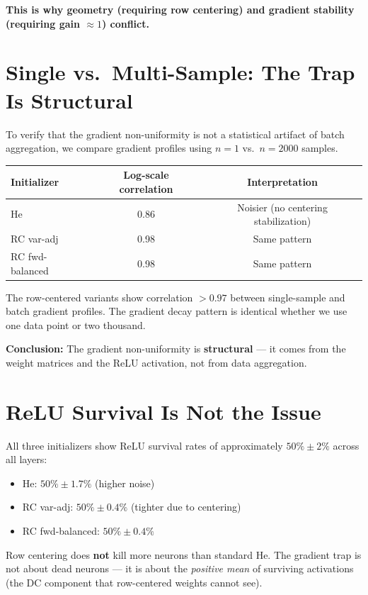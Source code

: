 \textbf{This is why geometry (requiring row centering) and gradient
stability (requiring gain $\approx 1$) conflict.}

\section{Single vs.\ Multi-Sample: The Trap Is Structural}
\label{sec:single_multi}

To verify that the gradient non-uniformity is not a statistical
artifact of batch aggregation, we compare gradient profiles using
$n = 1$ vs.\ $n = 2000$ samples.

\begin{center}
\begin{tabular}{lcc}
\toprule
Initializer & Log-scale correlation & Interpretation \\
\midrule
He & 0.86 & Noisier (no centering stabilization) \\
RC var-adj & 0.98 & Same pattern \\
RC fwd-balanced & 0.98 & Same pattern \\
\bottomrule
\end{tabular}
\end{center}

The row-centered variants show correlation $> 0.97$ between single-sample
and batch gradient profiles.  The gradient decay pattern is identical
whether we use one data point or two thousand.

\textbf{Conclusion:} The gradient non-uniformity is \textbf{structural}
--- it comes from the weight matrices and the ReLU activation, not from
data aggregation.

\section{ReLU Survival Is Not the Issue}
\label{sec:relu_survival}

All three initializers show ReLU survival rates of approximately
$50\% \pm 2\%$ across all layers:

\begin{itemize}
  \item He: $50\% \pm 1.7\%$ (higher noise)
  \item RC var-adj: $50\% \pm 0.4\%$ (tighter due to centering)
  \item RC fwd-balanced: $50\% \pm 0.4\%$
\end{itemize}

Row centering does \textbf{not} kill more neurons than standard He.
The gradient trap is not about dead neurons --- it is about the
\emph{positive mean} of surviving activations (the DC component that
row-centered weights cannot see).

